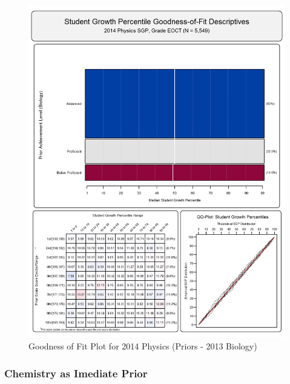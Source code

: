 \documentclass[12pt]{article}
\begin{document}
\begin{figure}[htbp]
\centering
\includegraphics{../img/Goodness_of_Fit/PHYSICS.2014/2014_PHYSICS_EOCT;2013_BIOLOGY_EOCT.png}
\caption{Goodness of Fit Plot for 2014 Physics (Priors - 2013 Biology)}
\end{figure}

\clearpage 

\subsubsection{Chemistry as Imediate
Prior}\label{chemistry-as-imediate-prior}
\end{document}
